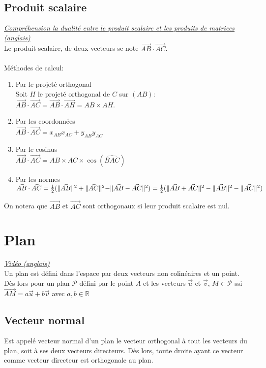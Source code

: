 \documentclass{article}
\begin{document}
\subsection{Produit scalaire}
\href{https://youtu.be/LyGKycYT2v0}{\underline{\textit{Compréhension la dualité entre le produit scalaire et les produits de matrices (anglais)}}}\\
\break
Le produit scalaire, de deux vecteurs se note $\Vec{AB} \cdot \Vec{AC}$.\\
\\
Méthodes de calcul:
\begin{enumerate}
	\item Par le projeté orthogonal \\Soit $H$ le projeté orthogonal de $C$ sur $(AB)$: $\Vec{AB} \cdot \Vec{AC} = \Vec{AB} \cdot \Vec{AH} = AB \times AH$.
	\item Par les coordonnées \\$\Vec{AB} \cdot \Vec{AC} = x_{AB}x_{AC}+y_{AB}y_{AC}$
	\item Par le cosinus \\$\Vec{AB} \cdot \Vec{AC} = AB\times AC\times \cos(\widehat{BAC})$
	\item Par les normes \\$\Vec{AB} \cdot \Vec{AC} = \frac{1}{2}(\lVert \Vec{AB} \rVert^2 + \lVert \Vec{AC}\rVert^2 - \rVert \Vec{AB} - \Vec{AC} \rVert ^2) \\ = \frac{1}{2}(\lVert \Vec{AB} + \Vec{AC} \rVert ^2 - \lVert \Vec{AB} \rVert^2 - \lVert \Vec{AC}\rVert^2)$
\end{enumerate}
On notera que $\Vec{AB}$ et $\Vec{AC}$ sont orthogonaux si leur produit scalaire est nul.


\section{Plan}
\href{https://youtu.be/k7RM-ot2NWY}{\underline{\textit{Vidéo (anglais)}}}\\
\break
Un plan est défini dans l'espace par deux vecteurs non colinéaires et un point.\\
Dès lors pour un plan $\mathcal{P}$ défini par le point $A$ et les vecteurs $\Vec{u}$ et $\Vec{v}$, $M \in \mathcal{P}$ ssi $\Vec{AM} = a\Vec{u}+b\Vec{v}$ avec $a,b\in\mathbb{R}$
\subsection{Vecteur normal}
Est appelé vecteur normal d'un plan le vecteur orthogonal à tout les vecteurs du plan, soit à ses deux vecteurs directeurs. Dès lors, toute droite ayant ce vecteur comme vecteur directeur est orthogonale au plan.
\end{document}
